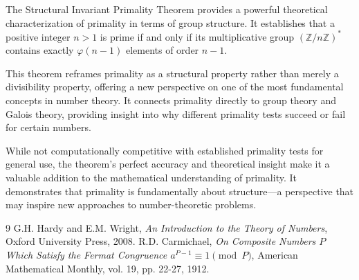 \documentclass[11pt,a4paper]{article}
\newcommand{\Z}{\mathbb{Z}}
\newcommand{\ZnZstar}[1]{(\Z/{#1}\Z)^{*}}
\newcommand{\totient}{\varphi}
\begin{document}
The Structural Invariant Primality Theorem provides a powerful theoretical characterization of primality in terms of group structure. It establishes that a positive integer $n > 1$ is prime if and only if its multiplicative group $\ZnZstar{n}$ contains exactly $\totient(n-1)$ elements of order $n-1$.

This theorem reframes primality as a structural property rather than merely a divisibility property, offering a new perspective on one of the most fundamental concepts in number theory. It connects primality directly to group theory and Galois theory, providing insight into why different primality tests succeed or fail for certain numbers.

While not computationally competitive with established primality tests for general use, the theorem's perfect accuracy and theoretical insight make it a valuable addition to the mathematical understanding of primality. It demonstrates that primality is fundamentally about structure—a perspective that may inspire new approaches to number-theoretic problems.

\begin{thebibliography}{9}
 G.H. Hardy and E.M. Wright, \emph{An Introduction to the Theory of Numbers}, Oxford University Press, 2008.
 R.D. Carmichael, \emph{On Composite Numbers $P$ Which Satisfy the Fermat Congruence $a^{P-1} \equiv 1 \pmod{P}$}, American Mathematical Monthly, vol. 19, pp. 22-27, 1912.
\end{thebibliography}
\end{document}
